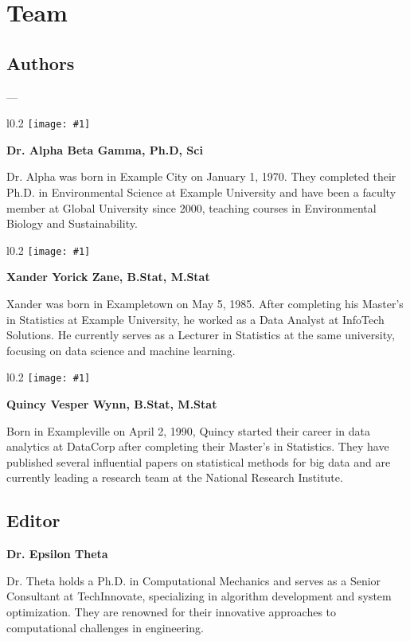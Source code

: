 \chapter*{Team}

\newcommand{\authorbio}[3]{
	\vspace{5pt} %
	\begin{wrapfigure}{l}{0.2\textwidth}
		\vspace{-12pt} %
		\texttt{[image: \#1]}
		\vspace{-24pt} %
	\end{wrapfigure}
	\noindent \textbf{#2}\par
	\noindent #3\par
	\vspace{5pt} %
}

\section*{Authors}

---

\authorbio{./Images/author-1.jpg}{Dr. Alpha Beta Gamma, Ph.D, Sci
}{Dr. Alpha was born in Example City on January 1, 1970. They completed their Ph.D. in Environmental Science at Example University and have been a faculty member at Global University since 2000, teaching courses in Environmental Biology and Sustainability.}

\authorbio{
	./Images/author-2.jpg
}{Xander Yorick Zane, B.Stat, M.Stat
}{Xander was born in Exampletown on May 5, 1985. After completing his Master's in Statistics at Example University, he worked as a Data Analyst at InfoTech Solutions. He currently serves as a Lecturer in Statistics at the same university, focusing on data science and machine learning.}

\authorbio{
	./Images/author-3.jpg
}{Quincy Vesper Wynn, B.Stat, M.Stat
}{Born in Exampleville on April 2, 1990, Quincy started their career in data analytics at DataCorp after completing their Master's in Statistics. They have published several influential papers on statistical methods for big data and are currently leading a research team at the National Research Institute.}

\section*{Editor}

\noindent \textbf{Dr. Epsilon Theta}\par
\noindent Dr. Theta holds a Ph.D. in Computational Mechanics and serves as a Senior Consultant at TechInnovate, specializing in algorithm development and system optimization. They are renowned for their innovative approaches to computational challenges in engineering.
